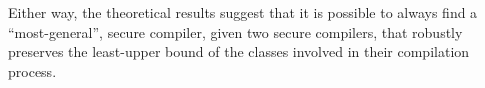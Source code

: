 \documentclass[dvipsnames,conference]{IEEEtran}
\theoremstyle{definition}
\begin{document}
Either way, the theoretical results suggest that it is possible to always find a ``most-general'', secure compiler, given two secure compilers, that robustly preserves the least-upper bound of the classes involved in their compilation process.



\end{document}
